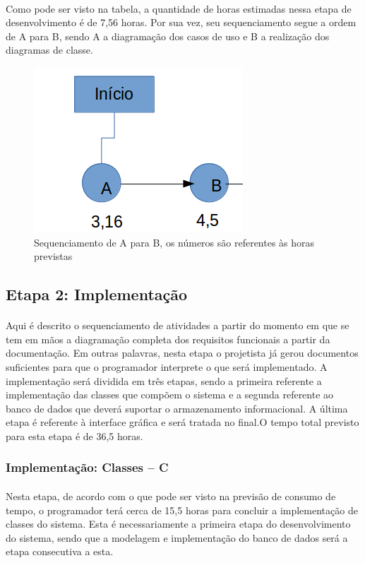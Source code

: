 \documentclass[12pt,a4paper]{article}
\begin{document}
		\paragraph{} Como pode ser visto na tabela, a quantidade de horas estimadas nessa etapa de desenvolvimento é de 7,56 horas. Por sua vez, seu sequenciamento segue a ordem de A para B, sendo A a diagramação dos casos de uso e B a realização dos diagramas de classe. \\
		\begin{figure}[!ht]
		\centering
		\includegraphics[scale=0.5]{001.png}
		\caption{Sequenciamento de A para B, os números são referentes às horas previstas}
		\end{figure}	
		\subsection{Etapa 2: Implementação}	
		\paragraph{} Aqui é descrito o sequenciamento de atividades a partir do momento em que se tem em mãos a diagramação completa dos requisitos funcionais a partir da documentação. Em outras palavras, nesta etapa o projetista já gerou documentos suficientes para que o programador interprete o que será implementado. A implementação será dividida em três etapas, sendo a primeira referente a implementação das classes que compõem o sistema e a segunda referente ao banco de dados que deverá suportar o armazenamento informacional. A última etapa é referente à interface gráfica e será tratada no final.O tempo total previsto para esta etapa é de 36,5 horas.         	
		\subsubsection{Implementação: Classes -- C}
		\paragraph{} Nesta etapa, de acordo com o que pode ser visto na previsão de consumo de tempo, o programador terá cerca de 15,5 horas para concluir a implementação de classes do sistema. Esta é necessariamente a primeira etapa do desenvolvimento do sistema, sendo que a modelagem e implementação do banco de dados será a etapa consecutiva a esta.
\end{document}
